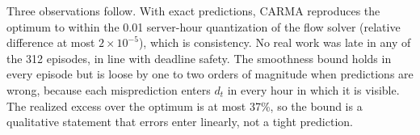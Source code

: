 Three observations follow. With exact predictions, CARMA reproduces the optimum to within the 0.01 server-hour quantization of the flow solver (relative difference at most $2\times10^{-5}$), which is consistency. No real work was late in any of the 312 episodes, in line with deadline safety. The smoothness bound holds in every episode but is loose by one to two orders of magnitude when predictions are wrong, because each misprediction enters $d_t$ in every hour in which it is visible. The realized excess over the optimum is at most 37\%, so the bound is a qualitative statement that errors enter linearly, not a tight prediction.
